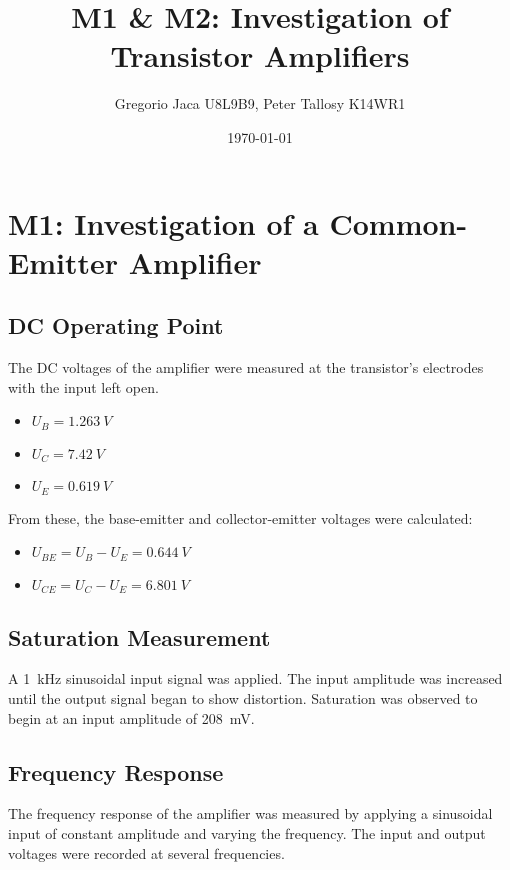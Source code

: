 \documentclass[12pt,a4paper]{article}
\title{M1 & M2: Investigation of Transistor Amplifiers}
\author{Gregorio Jaca U8L9B9, Peter Tallosy K14WR1 }
\date{\today}
\begin{document}
\maketitle

\section{M1: Investigation of a Common-Emitter Amplifier}

\subsection{DC Operating Point}
The DC voltages of the amplifier were measured at the transistor's electrodes with the input left open.
\begin{itemize}
    \item $U_B = \SI{1.263}{V}$
    \item $U_C = \SI{7.42}{V}$
    \item $U_E = \SI{0.619}{V}$
\end{itemize}
From these, the base-emitter and collector-emitter voltages were calculated:
\begin{itemize}
    \item $U_{BE} = U_B - U_E = \SI{0.644}{V}$
    \item $U_{CE} = U_C - U_E = \SI{6.801}{V}$
\end{itemize}

\subsection{Saturation Measurement}
A \SI{1}{kHz} sinusoidal input signal was applied. The input amplitude was increased until the output signal began to show distortion. Saturation was observed to begin at an input amplitude of \SI{208}{mV}.

\subsection{Frequency Response}
The frequency response of the amplifier was measured by applying a sinusoidal input of constant amplitude and varying the frequency. The input and output voltages were recorded at several frequencies.
\end{document}
